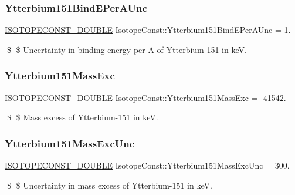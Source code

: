 \subsubsection{\texorpdfstring{Ytterbium151\+Bind\+E\+Per\+A\+Unc}{Ytterbium151BindEPerAUnc}}
{\footnotesize\ttfamily \mbox{\hyperlink{group___isotope_const-_macros_ga8f45a7272ce02c0b4c65c44636ed719a}{I\+S\+O\+T\+O\+P\+E\+C\+O\+N\+S\+T\+\_\+\+D\+O\+U\+B\+LE}} Isotope\+Const\+::\+Ytterbium151\+Bind\+E\+Per\+A\+Unc = 1.}

\$ \$ Uncertainty in binding energy per A of Ytterbium-\/151 in keV. \mbox{\label{group___isotope_const-_ytterbium-_yb151_gaab11b08538436d6351e451f4df96d5ab}} 
\subsubsection{\texorpdfstring{Ytterbium151\+Mass\+Exc}{Ytterbium151MassExc}}
{\footnotesize\ttfamily \mbox{\hyperlink{group___isotope_const-_macros_ga8f45a7272ce02c0b4c65c44636ed719a}{I\+S\+O\+T\+O\+P\+E\+C\+O\+N\+S\+T\+\_\+\+D\+O\+U\+B\+LE}} Isotope\+Const\+::\+Ytterbium151\+Mass\+Exc = -\/41542.}

\$ \$ Mass excess of Ytterbium-\/151 in keV. \mbox{\label{group___isotope_const-_ytterbium-_yb151_gaf0f099baa55d34038f6f57641fd37926}} 
\subsubsection{\texorpdfstring{Ytterbium151\+Mass\+Exc\+Unc}{Ytterbium151MassExcUnc}}
{\footnotesize\ttfamily \mbox{\hyperlink{group___isotope_const-_macros_ga8f45a7272ce02c0b4c65c44636ed719a}{I\+S\+O\+T\+O\+P\+E\+C\+O\+N\+S\+T\+\_\+\+D\+O\+U\+B\+LE}} Isotope\+Const\+::\+Ytterbium151\+Mass\+Exc\+Unc = 300.}

\$ \$ Uncertainty in mass excess of Ytterbium-\/151 in keV. \mbox{\label{group___isotope_const-_ytterbium-_yb151_ga4759b2f9ccd22373890ab2aff1e704a0}} 
